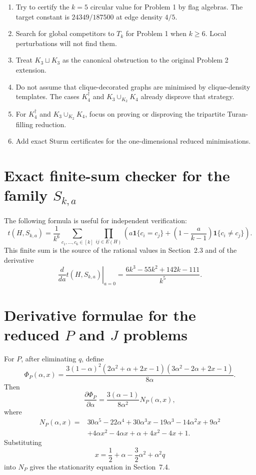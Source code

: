 \documentclass[11pt]{amsart}
\theoremstyle{definition}
\newcommand{\1}{\mathbf 1}
\begin{document}
\begin{enumerate}[label=\textbf{Task \arabic*.}]
\item Try to certify the $k=5$ circular value for Problem 1 by flag algebras.  The target constant is $24349/187500$ at edge density $4/5$.
\item Search for global competitors to $T_k$ for Problem 1 when $k\ge 6$.  Local perturbations will not find them.
\item Treat $K_3\sqcup K_3$ as the canonical obstruction to the original Problem 2 extension.
\item Do not assume that clique-decorated graphs are minimised by clique-density templates.  The cases $K_4^\dagger$ and $K_3\cup_{K_2}K_4$ already disprove that strategy.
\item For $K_4^\dagger$ and $K_3\cup_{K_2}K_4$, focus on proving or disproving the tripartite Turan-filling reduction.
\item Add exact Sturm certificates for the one-dimensional reduced minimisations.
\end{enumerate}

\appendix

\section{Exact finite-sum checker for the family $S_{k,a}$}

The following formula is useful for independent verification:
\[
   t(H,S_{k,a})=\frac1{k^6}\sum_{c_1,\ldots,c_6\in[k]}
        \prod_{ij\in E(H)}
        \left(a\1\{c_i=c_j\}+\left(1-\frac{a}{k-1}\right)\1\{c_i\ne c_j\}\right).
\]
This finite sum is the source of the rational values in Section~2.3 and of the derivative
\[
   \left.\frac{d}{da}t(H,S_{k,a})\right|_{a=0}
   =\frac{6k^3-55k^2+142k-111}{k^5}.
\]

\section{Derivative formulae for the reduced $P$ and $J$ problems}

For $P$, after eliminating $q$, define
\[
   \Phi_P(\alpha,x)=
   \frac{3(1-\alpha)^2
     (2\alpha^2+\alpha+2x-1)
     (3\alpha^2-2\alpha+2x-1)}{8\alpha}.
\]
Then
\[
\frac{\partial \Phi_P}{\partial \alpha}
=\frac{3(\alpha-1)}{8\alpha^2}N_P(\alpha,x),
\]
where
\[
\begin{split}
N_P(\alpha,x)={}&30\alpha^5-22\alpha^4+30\alpha^3x-19\alpha^3
-14\alpha^2x+9\alpha^2\\
&+4\alpha x^2-4\alpha x+\alpha+4x^2-4x+1.
\end{split}
\]
Substituting
\[
   x=\frac12+\alpha-\frac32\alpha^2+\alpha^2q
\]
into $N_P$ gives the stationarity equation in Section~7.4.
\end{document}

